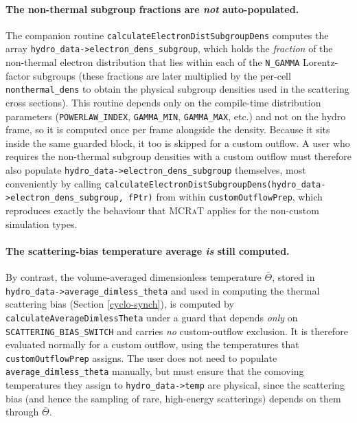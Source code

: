 \documentclass[12pt,a4paper]{article}
\newcommand{\mcrat}{\textsc{MCRaT}}
\begin{document}
\paragraph{The non-thermal subgroup fractions are \emph{not} auto-populated.}
The companion routine \texttt{calculateElectronDistSubgroupDens} computes the array \texttt{hydro\_data->electron\_dens\_subgroup}, which holds the \emph{fraction} of the non-thermal electron distribution that lies within each of the \texttt{N\_GAMMA} Lorentz-factor subgroups (these fractions are later multiplied by the per-cell \texttt{nonthermal\_dens} to obtain the physical subgroup densities used in the scattering cross sections). This routine depends only on the compile-time distribution parameters (\texttt{POWERLAW\_INDEX}, \texttt{GAMMA\_MIN}, \texttt{GAMMA\_MAX}, etc.) and not on the hydro frame, so it is computed once per frame alongside the density. Because it sits inside the same guarded block, it too is skipped for a custom outflow. A user who requires the non-thermal subgroup densities with a custom outflow must therefore also populate \texttt{hydro\_data->electron\_dens\_subgroup} themselves, most conveniently by calling \texttt{calculateElectronDistSubgroupDens(hydro\_data->electron\_dens\_subgroup, fPtr)} from within \texttt{customOutflowPrep}, which reproduces exactly the behaviour that \mcrat{} applies for the non-custom simulation types.

\paragraph{The scattering-bias temperature average \emph{is} still computed.}
By contrast, the volume-averaged dimensionless temperature $\bar{\Theta}$, stored in \texttt{hydro\_data->average\_dimless\_theta} and used in computing the thermal scattering bias (Section \ref{cyclo-synch}), is computed by \texttt{calculateAverageDimlessTheta} under a guard that depends \emph{only} on \texttt{SCATTERING\_BIAS\_SWITCH} and carries \emph{no} custom-outflow exclusion. It is therefore evaluated normally for a custom outflow, using the temperatures that \texttt{customOutflowPrep} assigns. The user does not need to populate \texttt{average\_dimless\_theta} manually, but must ensure that the comoving temperatures they assign to \texttt{hydro\_data->temp} are physical, since the scattering bias (and hence the sampling of rare, high-energy scatterings) depends on them through $\bar{\Theta}$.
\end{document}
